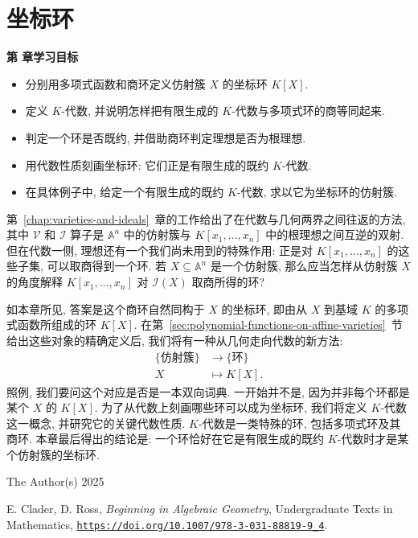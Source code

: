 \chapter{坐标环}\label{chap:coordinate-rings}

\noindent\textbf{第 \thechapter{} 章学习目标}
\begin{itemize}
  \item 分别用多项式函数和商环定义仿射簇 $X$ 的坐标环 $K[X]$.
  \item 定义 $K$-代数, 并说明怎样把有限生成的 $K$-代数与多项式环的商等同起来.
  \item 判定一个环是否既约, 并借助商环判定理想是否为根理想.
  \item 用代数性质刻画坐标环: 它们正是有限生成的既约 $K$-代数.
  \item 在具体例子中, 给定一个有限生成的既约 $K$-代数, 求以它为坐标环的仿射簇.
\end{itemize}

第~\ref{chap:varieties-and-ideals}~章的工作给出了在代数与几何两界之间往返的方法, 其中 $\mathcal{V}$ 和 $\mathcal{I}$ 算子是 $\mathbb{A}^{n}$ 中的仿射簇与 $K[x_{1},\ldots,x_{n}]$ 中的根理想之间互逆的双射. 但在代数一侧, 理想还有一个我们尚未用到的特殊作用: 正是对 $K[x_{1},\ldots,x_{n}]$ 的这些子集, 可以取商得到一个环. 若 $X\subseteq\mathbb{A}^{n}$ 是一个仿射簇, 那么应当怎样从仿射簇 $X$ 的角度解释 $K[x_{1},\ldots,x_{n}]$ 对 $\mathcal{I}(X)$ 取商所得的环?

如本章所见, 答案是这个商环自然同构于 $X$ 的坐标环, 即由从 $X$ 到基域 $K$ 的多项式函数所组成的环 $K[X]$. 在第~\ref{sec:polynomial-functions-on-affine-varieties}~节给出这些对象的精确定义后, 我们将有一种从几何走向代数的新方法:
\[
  \begin{aligned}
    \{\text{仿射簇}\}&\to\{\text{环}\}\\
    X&\mapsto K[X].
  \end{aligned}
\]
照例, 我们要问这个对应是否是一本双向词典. 一开始并不是, 因为并非每个环都是某个 $X$ 的 $K[X]$. 为了从代数上刻画哪些环可以成为坐标环, 我们将定义 $K$-代数这一概念, 并研究它的关键代数性质. $K$-代数是一类特殊的环, 包括多项式环及其商环. 本章最后得出的结论是: 一个环恰好在它是有限生成的既约 $K$-代数时才是某个仿射簇的坐标环.

\par\smallskip
{\footnotesize
\noindent\textcopyright{} The Author(s) 2025\par
\noindent E. Clader, D. Ross, \emph{Beginning in Algebraic Geometry}, Undergraduate Texts in Mathematics,
\href{https://doi.org/10.1007/978-3-031-88819-9_4}{\nolinkurl{https://doi.org/10.1007/978-3-031-88819-9_4}}.\par}
